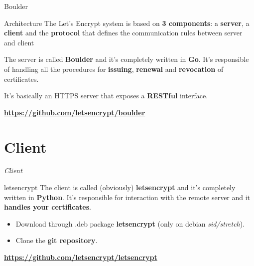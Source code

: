 \documentclass[xcolor=svgnames,11pt]{beamer}
\begin{document}
\begin{frame}{Boulder}
\begin{block}{Architecture}
The Let's Encrypt system is based on \textbf{3 components}: a \textbf{server}, a \textbf{client} and the \textbf{protocol} that defines the communication rules between server and client
\end{block}

\medskip \pause

The server is called \textbf{Boulder} and it's completely written in \textbf{Go}. It's responsible of handling all the procedures for \textbf{issuing}, \textbf{renewal} and \textbf{revocation} of certificates.
\medskip \pause

It's basically an HTTPS server that exposes a \textbf{RESTful} interface.

\medskip \pause

\begin{center}
 \textbf{\url{https://github.com/letsencrypt/boulder}}
\end{center}
\end{frame}

\section{Client}
\begin{frame}{}
\begin{center}
\begin{Huge}
\textcolor{leorange}{\emph{Client}}
\end{Huge}
\end{center}
\end{frame}

\begin{frame}{letsencrypt}
The client is called (obviously) \textbf{letsencrypt} and it's completely written in \textbf{Python}.
It's responsible for interaction with the remote server and it \textbf{handles your certificates}.
\pause
\begin{itemize}
  \item Download through .deb package \textbf{letsencrypt} (only on debian \emph{sid/stretch}).
  \item Clone the \textbf{git repository}.
\end{itemize}
\pause
\begin{center}
 \textbf{\url{https://github.com/letsencrypt/letsencrypt}}
\end{center}
\end{frame}
\end{document}
